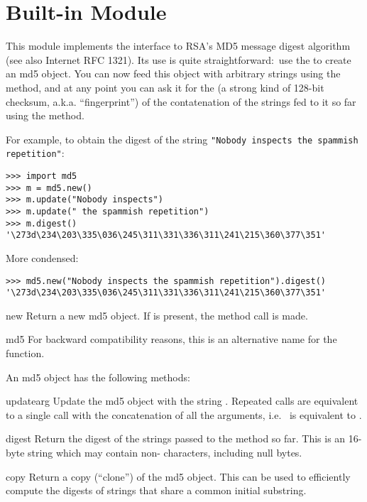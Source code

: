 \section{Built-in Module }

This module implements the interface to RSA's MD5 message digest
algorithm (see also Internet RFC 1321).  Its use is quite
straightforward:\ use the  to create an md5 object.
You can now feed this object with arbitrary strings using the
 method, and at any point you can ask it for the
 (a strong kind of 128-bit checksum,
a.k.a. ``fingerprint'') of the contatenation of the strings fed to it
so far using the  method.

For example, to obtain the digest of the string {\tt"Nobody inspects
the spammish repetition"}:

\bcode\begin{verbatim}
>>> import md5
>>> m = md5.new()
>>> m.update("Nobody inspects")
>>> m.update(" the spammish repetition")
>>> m.digest()
'\273d\234\203\335\036\245\311\331\336\311\241\215\360\377\351'
\end{verbatim}\ecode

More condensed:

\bcode\begin{verbatim}
>>> md5.new("Nobody inspects the spammish repetition").digest()
'\273d\234\203\335\036\245\311\331\336\311\241\215\360\377\351'
\end{verbatim}\ecode

\renewcommand{\indexsubitem}{(in module md5)}

\begin{funcdesc}{new}{}
Return a new md5 object.  If  is present, the method call
 is made.
\end{funcdesc}

\begin{funcdesc}{md5}{}
For backward compatibility reasons, this is an alternative name for the
 function.
\end{funcdesc}

An md5 object has the following methods:

\renewcommand{\indexsubitem}{(md5 method)}
\begin{funcdesc}{update}{arg}
Update the md5 object with the string .  Repeated calls are
equivalent to a single call with the concatenation of all the
arguments, i.e.\  is equivalent to
.
\end{funcdesc}

\begin{funcdesc}{digest}{}
Return the digest of the strings passed to the 
method so far.  This is an 16-byte string which may contain
non-\ASCII{} characters, including null bytes.
\end{funcdesc}

\begin{funcdesc}{copy}{}
Return a copy (``clone'') of the md5 object.  This can be used to
efficiently compute the digests of strings that share a common initial
substring.
\end{funcdesc}
